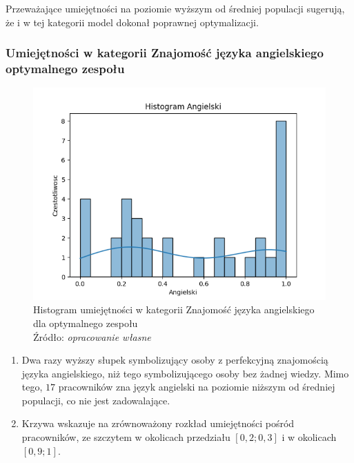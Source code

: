         \par Przeważające umiejętności na poziomie wyższym od średniej populacji sugerują, że i w tej kategorii model dokonał poprawnej optymalizacji.
        
        \subsubsection{Umiejętności w kategorii Znajomość języka angielskiego optymalnego zespołu}
        \begin{figure}[H]
            \centering
            \includegraphics[width=\linewidth]{chapters/Images/hist_ang_optimal.png}
            \cprotect\caption{Histogram umiejętności w kategorii Znajomość języka angielskiego dla optymalnego zespołu\\ Źródło:\textit{ opracowanie własne}}
            \label{fig:hist_ang_optimal}
        \end{figure}

        \begin{enumerate}
            \item Dwa razy wyższy słupek symbolizujący osoby z perfekcyjną znajomością języka angielskiego, niż tego symbolizującego osoby bez żadnej wiedzy. Mimo tego, $17$ pracowników zna język angielski na poziomie niższym od średniej populacji, co nie jest zadowalające.
            \item Krzywa wskazuje na zrównoważony rozkład umiejętności pośród pracowników, ze szczytem w okolicach przedziału $[0,2; 0,3]$ i w okolicach $[0,9; 1]$.
        \end{enumerate}


